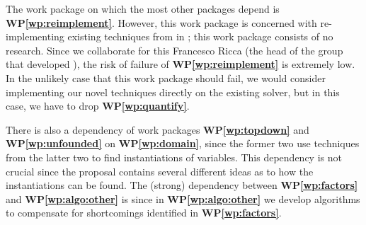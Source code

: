 \documentclass[a4paper,11pt]{article}
\newcommand{\alphasolver}{\logicname{alpha}}
\newcommand{\wasp}{\logicname{wasp}}
\newcommand\WPref[1]{\textbf{WP\ref{#1}}}
\begin{document}
The work package on which the most other packages depend is \WPref{wp:reimplement}. However, this work package is concerned with re-implementing existing techniques from \alphasolver in \wasp; this work package consists of no research. Since we collaborate for this Francesco Ricca (the head of the group that developed \wasp), the risk of failure of \WPref{wp:reimplement} is extremely low. 
In the unlikely case that this work package should fail, 
we would consider implementing our novel techniques directly on the existing \alphasolver solver, but in this case, we have to drop  \WPref{wp:quantify}. 



There is also a dependency of work packages \WPref{wp:topdown} and \WPref{wp:unfounded} on \WPref{wp:domain}, since the former two use techniques from the latter two to find instantiations of variables. This dependency is not crucial since the proposal contains several different ideas as to how the instantiations can be found. 
The (strong) dependency between \WPref{wp:factors} and \WPref{wp:algo:other} is since in \WPref{wp:algo:other} we develop algorithms to compensate for shortcomings identified in \WPref{wp:factors}. %

% 
\end{document}

